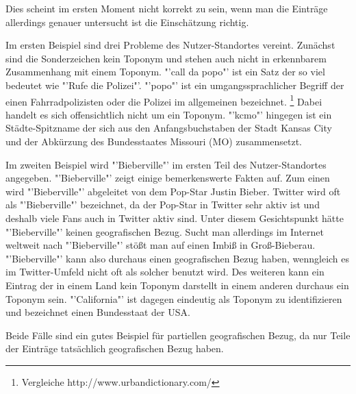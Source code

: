 						Dies scheint im ersten Moment nicht korrekt zu sein, wenn man die Einträge allerdings genauer untersucht ist die Einschätzung richtig.

						Im ersten Beispiel sind drei Probleme des Nutzer-Standortes vereint.
						Zunächst sind die Sonderzeichen kein Toponym und stehen auch nicht in erkennbarem Zusammenhang mit einem Toponym.
						"'call da popo"' ist ein Satz der so viel bedeutet wie "'Rufe die Polizei"'. 
						"'popo"' ist ein umgangssprachlicher Begriff der einen Fahrradpolizisten oder die Polizei im allgemeinen bezeichnet. \footnote{Vergleiche http://www.urbandictionary.com/}
						Dabei handelt es sich offensichtlich nicht um ein Toponym.
						"'kcmo"' hingegen ist ein Städte-Spitzname der sich aus den Anfangsbuchstaben der Stadt Kansas City und der Abkürzung des Bundesstaates Missouri (MO) zusammensetzt.


						Im zweiten Beispiel wird "'Bieberville"' im ersten Teil des Nutzer-Standortes angegeben. 
						"'Bieberville"' zeigt einige bemerkenswerte Fakten auf.
						Zum einen wird "'Bieberville"' abgeleitet von dem Pop-Star Justin Bieber.	
						Twitter wird oft als "'Bieberville"' bezeichnet, da der Pop-Star in Twitter sehr aktiv ist und deshalb viele Fans auch in Twitter aktiv sind.
						Unter diesem Gesichtspunkt hätte "'Bieberville"' keinen geografischen Bezug.
						Sucht man allerdings im Internet weltweit nach "'Bieberville"' stößt man auf einen Imbiß in Groß-Bieberau.
						"'Bieberville"' kann also durchaus einen geografischen Bezug haben, wenngleich es im Twitter-Umfeld nicht oft als solcher benutzt wird. 
						Des weiteren kann ein Eintrag der in einem Land kein Toponym darstellt in einem anderen durchaus ein Toponym sein.
 						"'California"' ist dagegen eindeutig als Toponym zu identifizieren und bezeichnet einen Bundesstaat der USA.

						Beide Fälle sind ein gutes Beispiel für partiellen geografischen Bezug, da nur Teile der Einträge tatsächlich geografischen Bezug haben. 

